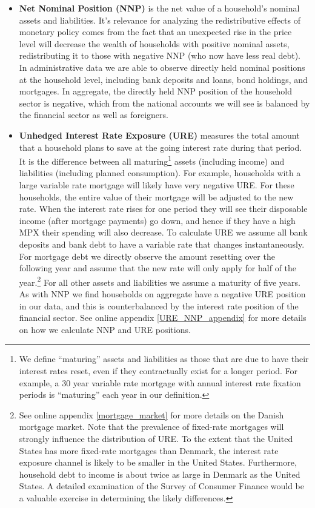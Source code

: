 \documentclass[titlepage]{\econtex}\newcommand{\texname}{ConsumptionHeterogeneity}
\begin{document}
\begin{itemize}
	\item \textbf{Net Nominal Position (NNP)} is the net value of a household's nominal assets and liabilities. It's relevance for analyzing the redistributive effects of monetary policy comes from the fact that an unexpected rise in the price level will decrease the wealth of households with positive nominal assets, redistributing it to those with negative NNP (who now have less real debt). In administrative data we are able to observe directly held nominal positions at the household level, including bank deposits and loans, bond holdings, and mortgages. In aggregate, the directly held NNP position of the household sector is negative, which from the national accounts we will see is balanced by the financial sector as well as foreigners.
	\item \textbf{Unhedged Interest Rate Exposure (URE)} measures the total amount that a household plans to save at the going interest rate during that period. It is the difference between all maturing\footnote{We define ``maturing'' assets and liabilities as those that are due to have their interest rates reset, even if they contractually exist for a longer period. For example, a 30 year variable rate mortgage with annual interest rate fixation periods is ``maturing'' each year in our definition.} assets (including income) and liabilities (including planned consumption). For example, households with a large variable rate mortgage will likely have very negative URE. For these households, the entire value of their mortgage will be adjusted to the new rate. When the interest rate rises for one period they will see their disposable income (after mortgage payments) go down, and hence if they have a high MPX their spending will also decrease. To calculate URE we assume all bank deposits and bank debt to have a variable rate that changes instantaneously. For mortgage debt we directly observe the amount resetting over the following year and assume that the new rate will only apply for half of the year.\footnote{See online appendix \ref{mortgage_market} for more details on the Danish mortgage market. Note that the prevalence of fixed-rate mortgages will strongly influence the distribution of URE. To the extent that the United States has more fixed-rate mortgages than Denmark, the interest rate exposure channel is likely to be smaller in the United States. Furthermore, household debt to income is about twice as large in Denmark as the United States. A detailed examination of the Survey of Consumer Finance would be a valuable exercise in determining the likely differences.} For all other assets and liabilities we assume a maturity of five years. As with NNP we find households on aggregate have a negative URE position in our data, and this is counterbalanced by the interest rate position of the financial sector. See online appendix \ref{URE_NNP_appendix} for more details on how we calculate NNP and URE positions.
\end{itemize}
\end{document}
